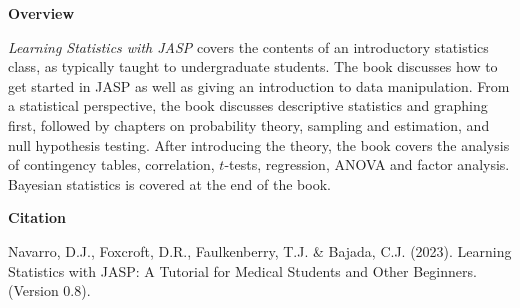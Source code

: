 

\clearpage
\newpage
\begin{center}
{\bf Overview}
\end{center}

\noindent
{\it Learning Statistics with JASP} covers the contents of an introductory statistics class, as typically taught to undergraduate students. The book discusses how to get started in JASP as well as giving an introduction to data manipulation. From a statistical perspective, the book discusses descriptive statistics and graphing first, followed by chapters on probability theory, sampling and estimation, and null hypothesis testing. After introducing the theory, the book covers the analysis of contingency tables, correlation, $t$-tests, regression, ANOVA and factor analysis. Bayesian statistics is covered at the end of the book. 

\vspace{14cm}
\begin{center}
{\bf Citation}
\end{center}

\noindent
Navarro, D.J., Foxcroft, D.R., Faulkenberry, T.J. \& Bajada, C.J. (2023). Learning Statistics with JASP: A Tutorial for Medical Students and Other Beginners. (Version 0.8). 